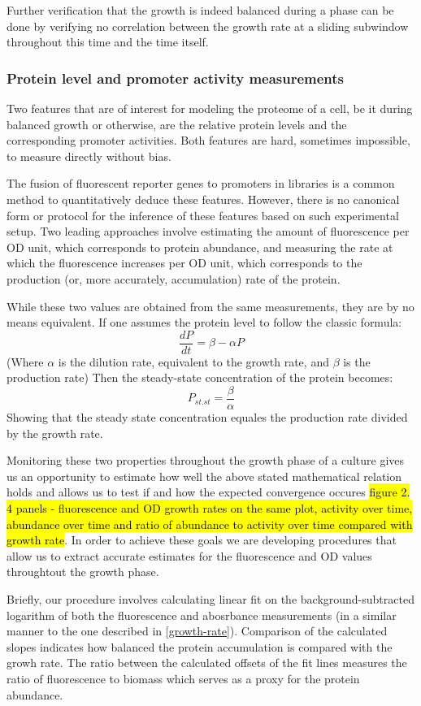 \documentclass{report}
\begin{document}
Further verification that the growth is indeed balanced during a phase can be done by verifying no correlation between the growth rate at a sliding subwindow throughout this time and the time itself.
\subsubsection{Protein level and promoter activity measurements}
Two features that are of interest for modeling the proteome of a cell, be it during balanced growth or otherwise, are the relative protein levels and the corresponding promoter activities.
Both features are hard, sometimes impossible, to measure directly without bias.

The fusion of fluorescent reporter genes to promoters in libraries is a common method to quantitatively deduce these features.
However, there is no canonical form or protocol for the inference of these features based on such experimental setup.
Two leading approaches involve estimating the amount of fluorescence per OD unit, which corresponds to protein abundance, and measuring the rate at which the fluorescence increases per OD unit, which corresponds to the production (or, more accurately, accumulation) rate of the protein.

While these two values are obtained from the same measurements, they are by no means equivalent.
If one assumes the protein level to follow the classic formula:
\[ \frac{dP}{dt}=\beta-\alpha P\]
(Where $\alpha$ is the dilution rate, equivalent to the growth rate, and $\beta$ is the production rate)
Then the steady-state concentration of the protein becomes:
\[ P_{st.st}=\frac{\beta}{\alpha}\]
Showing that the steady state concentration equales the production rate divided by the growth rate.

Monitoring these two properties throughout the growth phase of a culture gives us an opportunity to estimate how well the above stated mathematical relation holds and allows us to test if and how the expected convergence occures \hl{figure 2. 4 panels - fluorescence and OD growth rates on the same plot, activity over time, abundance over time and ratio of abundance to activity over time compared with growth rate}.
In order to achieve these goals we are developing procedures that allow us to extract accurate estimates for the fluorescence and OD values throughtout the growth phase.

Briefly, our procedure involves calculating linear fit on the background-subtracted logarithm of both the fluorescence and abosrbance measurements (in a similar manner to the one described in \ref{growth-rate}).
Comparison of the calculated slopes indicates how balanced the protein accumulation is compared with the growh rate.
The ratio between the calculated offsets of the fit lines measures the ratio of fluorescence to biomass which serves as a proxy for the protein abundance.
\end{document}
